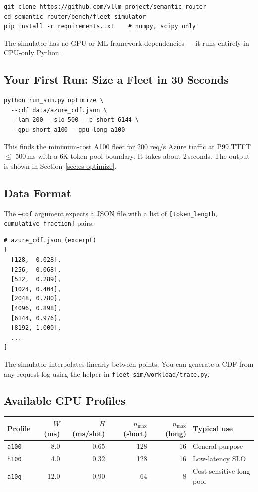 \documentclass[11pt,a4paper]{article}
\begin{document}
\begin{lstlisting}[style=shell]
git clone https://github.com/vllm-project/semantic-router
cd semantic-router/bench/fleet-simulator
pip install -r requirements.txt    # numpy, scipy only
\end{lstlisting}

The simulator has no GPU or ML framework dependencies --- it runs
entirely in CPU-only Python.

\subsection{Your First Run: Size a Fleet in 30 Seconds}

\begin{lstlisting}[style=shell]
python run_sim.py optimize \
  --cdf data/azure_cdf.json \
  --lam 200 --slo 500 --b-short 6144 \
  --gpu-short a100 --gpu-long a100
\end{lstlisting}

This finds the minimum-cost A100 fleet for 200 req/s Azure traffic
at P99 TTFT $\leq$ 500\,ms with a 6K-token pool boundary.
It takes about 2\,seconds.  The output is shown in
Section~\ref{sec:cs-optimize}.

\subsection{Data Format}

The \texttt{--cdf} argument expects a JSON file with a list of
\texttt{[token\_length, cumulative\_fraction]} pairs:

\begin{lstlisting}[style=python]
# azure_cdf.json (excerpt)
[
  [128,  0.028],
  [256,  0.068],
  [512,  0.289],
  [1024, 0.404],
  [2048, 0.780],
  [4096, 0.898],
  [6144, 0.976],
  [8192, 1.000],
  ...
]
\end{lstlisting}

The simulator interpolates linearly between points.  You can generate
a CDF from any request log using the helper in
\texttt{fleet\_sim/workload/trace.py}.

\subsection{Available GPU Profiles}

\begin{center}
\begin{tabular}{lrrrrl}
\toprule
Profile & $W$ (ms) & $H$ (ms/slot) & $n_{\max}$ (short) & $n_{\max}$ (long)
  & Typical use \\
\midrule
\texttt{a100} & 8.0 & 0.65 & 128 & 16 & General purpose \\
\texttt{h100} & 4.0 & 0.32 & 128 & 16 & Low-latency SLO \\
\texttt{a10g} & 12.0 & 0.90 & 64  & 8  & Cost-sensitive long pool \\
\bottomrule
\end{tabular}
\end{center}
\end{document}
